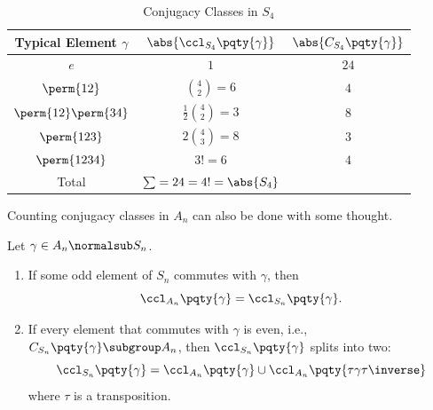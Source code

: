 \begin{table}[ht!]
    \centering
    \begin{tabular}{ccc}
        Typical Element \(\gamma\) & \(\abs{\ccl_{S_4} \pqty{\gamma}}\) & \(\abs{C_{S_4} \pqty{\gamma}}\) \\
        \hline\hline
        \(e\) & \(1\) & \(24\) \\
        \(\perm{12}\) & \(\binom{4}{2} = 6\) & \(4\) \\
        \(\perm{12}\perm{34}\) & \(\frac{1}{2} \binom{4}{2} = 3\) & \(8\) \\
        \(\perm{123}\) & \(2 \binom{4}{3} = 8\) & \(3\) \\
        \(\perm{1234}\) & \(3! = 6\) & \(4\) \\
        \hline
        Total & \(\sum = 24 = 4! = \abs{S_4}\) &
    \end{tabular}
    \caption{Conjugacy Classes in \(S_4\)}
    \label{tab:conjugacy-class-s4}
\end{table}

Counting conjugacy classes in \(A_n\) can also be done with some thought.

\begin{lemma}
    \label{lem:conjugacy-class-an}%
    Let \(\gamma \in A_n \normalsub S_n\).
    \begin{enumerate}
        \item If some odd element of \(S_n\) commutes with \(\gamma\), then
        \[
            \ccl_{A_n} \pqty{\gamma} = \ccl_{S_n} \pqty{\gamma}.
        \]
        \item If every element that commutes with \(\gamma\) is even, i.e., \(C_{S_n} \pqty{\gamma} \subgroup A_n\), then \(\ccl_{S_n} \pqty{\gamma}\) splits into two:
        \[
            \ccl_{S_n} \pqty{\gamma} = \ccl_{A_n} \pqty{\gamma} \cup \ccl_{A_n} \pqty{\tau \gamma \tau\inverse}
        \]
        where \(\tau\) is a transposition.
    \end{enumerate}
\end{lemma}

